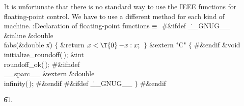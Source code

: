 It is unfortunate that there is no standard way to use the IEEE functions
for floating-point control.  We have to use a different
method for each kind of machine.
\Y\B\4:Declaration of floating-point functions\X${}\equiv{}$\6
\8\#\&{ifdef} \.{\_\_GNUG\_\_}\6
\&{inline} \&{double} \\{fabs}(\&{double} \|x)\1\1\2\2\6
${}\{{}$\1\6
\&{return} ${}\|x<\T{0}\?{-}\|x:\|x;{}$\6
\4${}\}{}$\2\7
\&{extern} \.{"C"}\1\1\2\2\6
${}\{{}$\6
\8\#\&{endif}\1\6
\&{void} \\{initialize\_roundoff}(\,);\6
\&{int} \\{roundoff\_ok}(\,);\6
\8\#\&{ifndef} \\{\_\_sparc\_\_}\6
\&{extern} \&{double} \\{infinity}(\,);\6
\8\#\&{endif}\6
\8\#\&{ifdef} \.{\_\_GNUG\_\_}\6
\4${}\}{}$\2\6
\8\#\&{endif}\par
\U61.\fi

